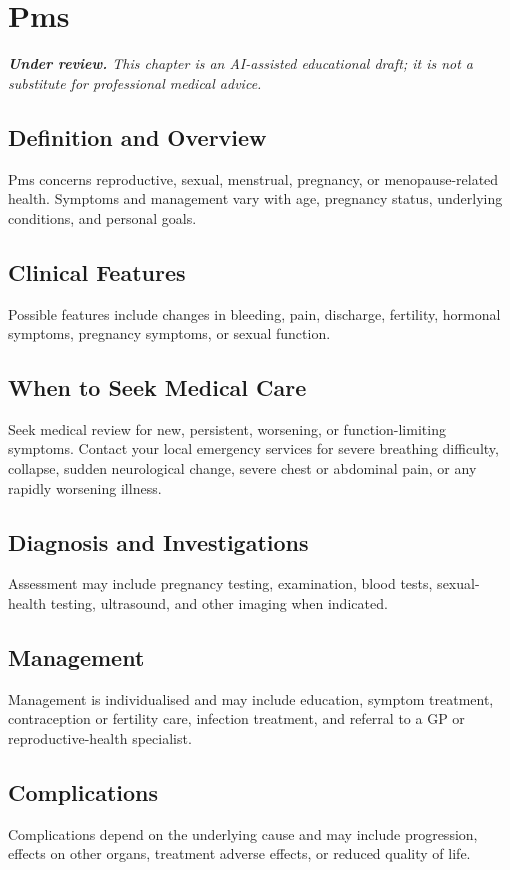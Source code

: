 \chapter{Pms}

\medskip
\noindent\textit{\textbf{Under review.} This chapter is an AI-assisted educational draft; it is not a substitute for professional medical advice.}

\section*{Definition and Overview}
Pms concerns reproductive, sexual, menstrual, pregnancy, or menopause-related health. Symptoms and management vary with age, pregnancy status, underlying conditions, and personal goals.

\section*{Clinical Features}
Possible features include changes in bleeding, pain, discharge, fertility, hormonal symptoms, pregnancy symptoms, or sexual function.

\section*{When to Seek Medical Care}
Seek medical review for new, persistent, worsening, or function-limiting symptoms. Contact your local emergency services for severe breathing difficulty, collapse, sudden neurological change, severe chest or abdominal pain, or any rapidly worsening illness.

\section*{Diagnosis and Investigations}
Assessment may include pregnancy testing, examination, blood tests, sexual-health testing, ultrasound, and other imaging when indicated.

\section*{Management}
Management is individualised and may include education, symptom treatment, contraception or fertility care, infection treatment, and referral to a GP or reproductive-health specialist.

\section*{Complications}
Complications depend on the underlying cause and may include progression, effects on other organs, treatment adverse effects, or reduced quality of life.

